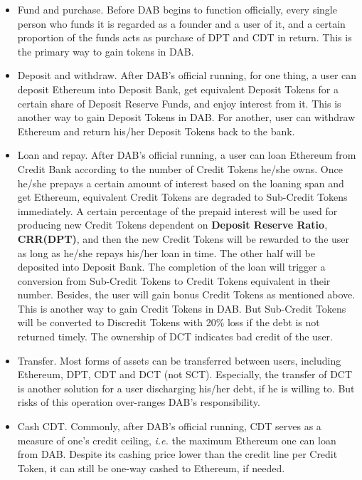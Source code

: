 \documentclass[review]{elsarticle}
\begin{document}
\begin{itemize}
   \item Fund and purchase. Before DAB begins to function officially, every single person who funds it is regarded as a founder and a user of it, and a certain proportion of the funds acts as purchase of DPT and CDT in return. This is the primary way to gain tokens in DAB.
   \item Deposit and withdraw. After DAB's official running, for one thing, a user can deposit Ethereum into Deposit Bank, get equivalent Deposit Tokens for a certain share of Deposit Reserve Funds, and enjoy interest from it. This is another way to gain Deposit Tokens in DAB. For another, user can withdraw Ethereum and return his/her Deposit Tokens back to the bank.
   \item Loan and repay. After DAB's official running, a user can loan Ethereum from Credit Bank according to the number of Credit Tokens he/she owns. Once he/she prepays a certain amount of interest based on the loaning span and get Ethereum, equivalent Credit Tokens are degraded to Sub-Credit Tokens immediately. A certain percentage of the prepaid interest will be used for producing new Credit Tokens dependent on \textbf{Deposit Reserve Ratio}, \textbf{CRR(DPT)}, and then the new Credit Tokens will be rewarded to the user as long as he/she repays his/her loan in time. The other half will be deposited into Deposit Bank. The completion of the loan will trigger a conversion from Sub-Credit Tokens to Credit Tokens equivalent in their number. Besides, the user will gain bonus Credit Tokens as mentioned above. This is another way to gain Credit Tokens in DAB. But Sub-Credit Tokens will be converted to Discredit Tokens with 20\% loss if the debt is not returned timely. The ownership of DCT indicates bad credit of the user.
   \item Transfer. Most forms of assets can be transferred between users, including Ethereum, DPT, CDT and DCT (not SCT). Especially, the transfer of DCT is another solution for a user discharging his/her debt, if he is willing to. But risks of this operation over-ranges DAB's responsibility.
   \item Cash CDT. Commonly, after DAB's official running, CDT serves as a measure of one's credit ceiling, \emph{i.e.} the maximum Ethereum one can loan from DAB. Despite its cashing price lower than the credit line per Credit Token, it can still be one-way cashed to Ethereum, if needed.
\end{itemize}
\end{document}
